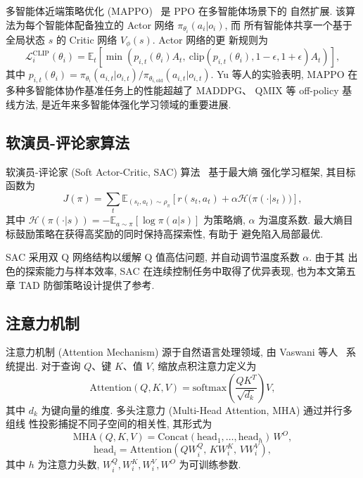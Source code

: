 多智能体近端策略优化 (MAPPO)~\cite{yu2022surprising} 是 PPO 在多智能体场景下的
自然扩展. 该算法为每个智能体配备独立的 Actor 网络 $\pi_{\theta_i}(a_i|o_i)$, 而
所有智能体共享一个基于全局状态 $s$ 的 Critic 网络 $V_\phi(s)$. Actor 网络的更
新规则为
\begin{equation}
\mathcal{L}_i^{\mathrm{CLIP}}(\theta_i) = \mathbb{E}_t\!\left[\min\!\left(p_{i,t}(\theta_i) A_t,\ \mathrm{clip}(p_{i,t}(\theta_i), 1-\epsilon, 1+\epsilon) A_t\right)\right],
\label{eq:mappo_actor}
\end{equation}
其中 $p_{i,t}(\theta_i) = \pi_{\theta_i}(a_{i,t}|o_{i,t}) / \pi_{\theta_{i,\mathrm{old}}}(a_{i,t}|o_{i,t})$.
Yu 等人的实验表明, MAPPO 在多种多智能体协作基准任务上的性能超越了 MADDPG、
QMIX 等 off-policy 基线方法, 是近年来多智能体强化学习领域的重要进展.

\subsection{软演员-评论家算法}
\label{subsec:sac}
软演员-评论家 (Soft Actor-Critic, SAC) 算法~\cite{haarnoja2018sac} 基于最大熵
强化学习框架, 其目标函数为
\begin{equation}
J(\pi) = \sum_{t}\mathbb{E}_{(s_t,a_t)\sim\rho_\pi}\!\left[r(s_t,a_t) + \alpha \mathcal{H}\big(\pi(\cdot|s_t)\big)\right],
\label{eq:sac_obj}
\end{equation}
其中 $\mathcal{H}(\pi(\cdot|s)) = -\mathbb{E}_{a\sim\pi}[\log\pi(a|s)]$ 为策略熵,
$\alpha$ 为温度系数. 最大熵目标鼓励策略在获得高奖励的同时保持高探索性, 有助于
避免陷入局部最优.

SAC 采用双 Q 网络结构以缓解 Q 值高估问题, 并自动调节温度系数 $\alpha$. 由于其
出色的探索能力与样本效率, SAC 在连续控制任务中取得了优异表现, 也为本文第五章
TAD 防御策略设计提供了参考.

\subsection{注意力机制}
\label{subsec:attention}
注意力机制 (Attention Mechanism) 源于自然语言处理领域, 由
Vaswani 等人~\cite{vaswani2017attention} 系统提出. 对于查询 $Q$、键 $K$、值
$V$, 缩放点积注意力定义为
\begin{equation}
\mathrm{Attention}(Q,K,V) = \mathrm{softmax}\!\left(\frac{QK^T}{\sqrt{d_k}}\right)V,
\label{eq:attention}
\end{equation}
其中 $d_k$ 为键向量的维度. 多头注意力 (Multi-Head Attention, MHA) 通过并行多组线
性投影捕捉不同子空间的相关性, 其形式为
\begin{equation}
\mathrm{MHA}(Q,K,V) = \mathrm{Concat}(\mathrm{head}_1,\ldots,\mathrm{head}_h)\,W^O,
\label{eq:mha}
\end{equation}
\begin{equation}
\mathrm{head}_i = \mathrm{Attention}(QW_i^Q,\, KW_i^K,\, VW_i^V),
\end{equation}
其中 $h$ 为注意力头数, $W_i^Q, W_i^K, W_i^V, W^O$ 为可训练参数.

